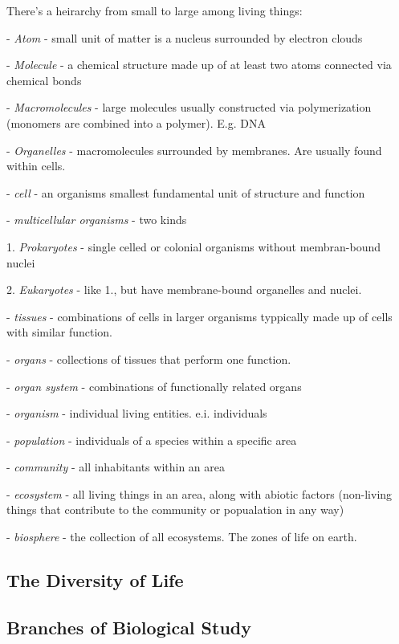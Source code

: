 \documentclass{article}
\theoremstyle{definition}
\begin{document}
There's a heirarchy from small to large among living things:

- \textit{Atom} - small unit of matter is a nucleus surrounded by electron clouds

- \textit{Molecule} - a chemical structure made up of at least two atoms connected via chemical bonds

- \textit{Macromolecules} - large molecules usually constructed via polymerization (monomers are combined into a polymer). E.g. DNA

- \textit{Organelles} - macromolecules surrounded by membranes. Are usually found within cells.

- \textit{cell} - an organisms smallest fundamental unit of structure and function

- \textit{multicellular organisms} - two kinds

1. \textit{Prokaryotes} - single celled or colonial organisms without membran-bound nuclei

2. \textit{Eukaryotes} - like 1., but have membrane-bound organelles and nuclei.

- \textit{tissues} - combinations of cells in larger organisms typpically made up of cells with similar function.

- \textit{organs} - collections of tissues that perform one function.

- \textit{organ system} - combinations of functionally related organs

- \textit{organism} - individual living entities. e.i. individuals

- \textit{population} - individuals of a species within a specific area

- \textit{community} - all inhabitants within an area

- \textit{ecosystem} - all living things in an area, along with abiotic factors (non-living things that contribute to the community or popualation in any way)

- \textit{biosphere} -  the collection of all ecosystems. The zones of life on earth.

\subsection{The Diversity of Life}

\subsection{Branches of Biological Study}
\end{document}
